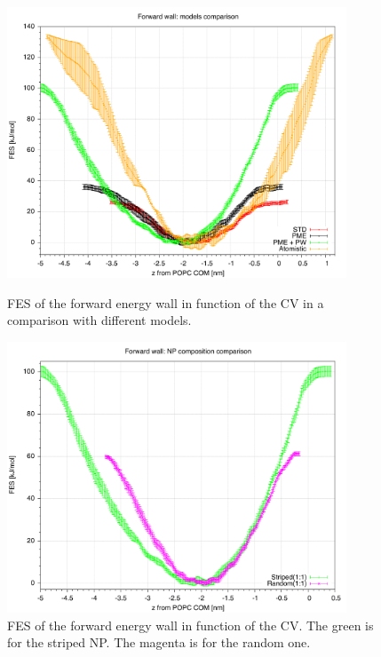 \begin{figure}[pth]
	\centering
	\includegraphics[width=0.9\textwidth]{./img/results/FESModelComparison/forwardWall}
	\caption{\acs{FES} of the forward energy wall in function of the \acs{CV} in a comparison with different models.}
	\label{fig:forwardWall}
	
	\vspace*{\floatsep}
	
	\includegraphics[width=0.9\textwidth]{./img/results/FESModelComparison/forwardWallRP}
	\caption{\acs{FES} of the forward energy wall in function of the \acs{CV}. The green is for the striped \acs{NP}. The magenta is for the random one.}
	\label{fig:forwardWallRP}
\end{figure}


